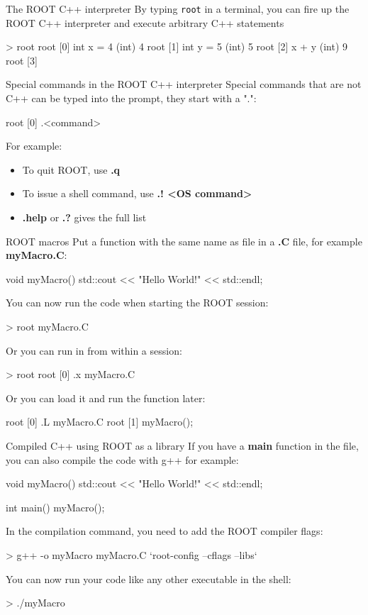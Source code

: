 \documentclass[aspectratio=169]{beamer}
\begin{document}
\begin{frame}[fragile]{The ROOT C++ interpreter}
By typing \texttt{root} in a terminal, you can fire up the ROOT C++ interpreter and execute arbitrary C++ statements
\begin{myterminal}
> root
root [0] int x = 4
(int) 4
root [1] int y = 5
(int) 5
root [2] x + y
(int) 9
root [3]
\end{myterminal}
\end{frame}

\begin{frame}[fragile]{Special commands in the ROOT C++ interpreter}
Special commands that are not C++ can be typed into the prompt, they start with a ".":
    \begin{myterminal}
root [0] .<command>
    \end{myterminal}
For example:
    \begin{itemize}
        \item To quit ROOT, use \textbf{.q}
        \item To issue a shell command, use \textbf{.! <OS command>}
        \item \textbf{.help} or \textbf{.?} gives the full list
    \end{itemize}
\end{frame}

\begin{frame}[fragile]{ROOT macros}
    Put a function with the same name as file in a \textbf{.C} file, for example \textbf{myMacro.C}:
\begin{cppcell}
void myMacro() {
   std::cout << "Hello World!" << std::endl;
}
\end{cppcell}
You can now run the code when starting the ROOT session:
\begin{myterminal}
> root myMacro.C
\end{myterminal}
Or you can run in from within a session:
\begin{myterminal}
> root
root [0] .x myMacro.C
\end{myterminal}
Or you can load it and run the function later:
\begin{myterminal}
root [0] .L myMacro.C
root [1] myMacro();
\end{myterminal}
\end{frame}

\begin{frame}[fragile]{Compiled C++ using ROOT as a library}
If you have a \textbf{main} function in the file, you can also compile the code with g++ for example:
\begin{cppcell}
void myMacro() {
   std::cout << "Hello World!" << std::endl;
}

int main() {
    myMacro();
}
\end{cppcell}
In the compilation command, you need to add the ROOT compiler flags:
\begin{myterminal}
> g++ -o myMacro myMacro.C `root-config --cflags --libs`
\end{myterminal}
You can now run your code like any other executable in the shell:
\begin{myterminal}
> ./myMacro
\end{myterminal}
\end{frame}
\end{document}
